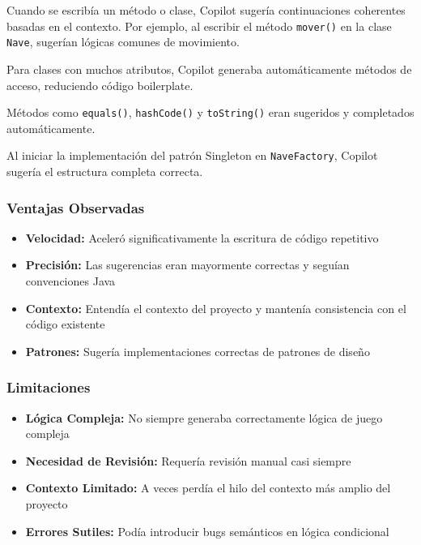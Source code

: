 \documentclass[12pt, a4paper]{article}
\begin{document}
\begin{description}[leftmargin=2em, style=nextline]
    \item[\textbf{Autocompletado de Código}]
        Cuando se escribía un método o clase, Copilot sugería continuaciones coherentes basadas en el contexto. Por ejemplo, al escribir el método \lstinline|mover()| en la clase \texttt{Nave}, sugerían lógicas comunes de movimiento.
    
    \item[\textbf{Generación de Getters y Setters}]
        Para clases con muchos atributos, Copilot generaba automáticamente métodos de acceso, reduciendo código boilerplate.
    
    \item[\textbf{Implementación de Métodos Comunes}]
        Métodos como \lstinline|equals()|, \lstinline|hashCode()| y \lstinline|toString()| eran sugeridos y completados automáticamente.
    
    \item[\textbf{Patrones de Diseño}]
        Al iniciar la implementación del patrón Singleton en \texttt{NaveFactory}, Copilot sugería el estructura completa correcta.
\end{description}

\subsubsection{Ventajas Observadas}

\begin{itemize}[leftmargin=2em]
    \item \textbf{Velocidad:} Aceleró significativamente la escritura de código repetitivo
    \item \textbf{Precisión:} Las sugerencias eran mayormente correctas y seguían convenciones Java
    \item \textbf{Contexto:} Entendía el contexto del proyecto y mantenía consistencia con el código existente
    \item \textbf{Patrones:} Sugería implementaciones correctas de patrones de diseño
\end{itemize}

\subsubsection{Limitaciones}

\begin{itemize}[leftmargin=2em]
    \item \textbf{Lógica Compleja:} No siempre generaba correctamente lógica de juego compleja
    \item \textbf{Necesidad de Revisión:} Requería revisión manual casi siempre
    \item \textbf{Contexto Limitado:} A veces perdía el hilo del contexto más amplio del proyecto
    \item \textbf{Errores Sutiles:} Podía introducir bugs semánticos en lógica condicional
\end{itemize}
\end{document}
